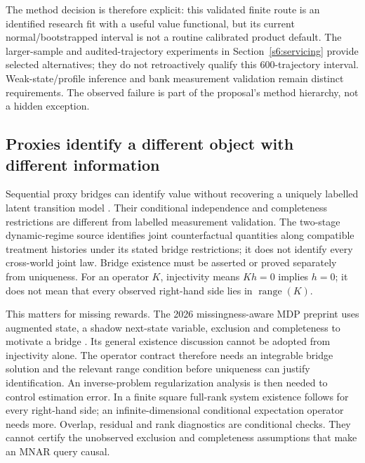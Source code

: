 The method decision is therefore explicit: this validated finite route is
an identified research fit with a useful value functional, but its current
normal/bootstrapped interval is not a routine calibrated product default.
The larger-sample and audited-trajectory experiments in
Section~\ref{s6:servicing} provide selected alternatives; they do not
retroactively qualify this 600-trajectory interval. Weak-state/profile
inference and bank measurement validation remain distinct requirements. The observed
failure is part of the proposal's method hierarchy, not a hidden exception.

\subsection{Proxies identify a different object with different information}
Sequential proxy bridges can identify value without recovering a uniquely
labelled latent transition model \citep{bennettprox2023,zhangprox2024}.
Their conditional independence and completeness restrictions are different
from labelled measurement validation. The two-stage dynamic-regime source
identifies joint counterfactual quantities along compatible treatment
histories under its stated bridge restrictions; it does not identify every
cross-world joint law. Bridge existence must be asserted or proved separately
from uniqueness. For an operator $K$, injectivity means $Kh=0$ implies
$h=0$; it does not mean that every observed right-hand side lies in
$\operatorname{range}(K)$.

This matters for missing rewards. The 2026 missingness-aware MDP preprint
uses augmented state, a shadow next-state variable, exclusion and completeness
to motivate a bridge \citep[Assumptions 3.1--3.4, Theorem 3.6]{wei2026}.
Its general existence discussion cannot be adopted from injectivity alone.
The operator contract therefore needs an integrable bridge solution and
the relevant range condition before uniqueness can justify identification.
An inverse-problem regularization analysis is then needed to control
estimation error. In a finite square full-rank system
existence follows for every right-hand side; an infinite-dimensional
conditional expectation operator needs more. Overlap, residual and rank
diagnostics are conditional checks. They cannot certify the unobserved
exclusion and completeness assumptions that make an MNAR query causal.
